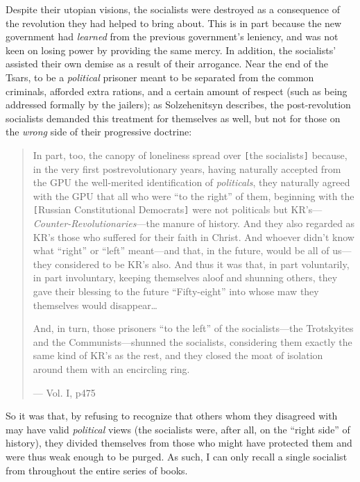 \documentclass{article}
\begin{document}
Despite their utopian visions, the socialists were destroyed as a consequence of the revolution they had helped to bring about.  This is in part because the new government had \emph{learned} from the previous government's leniency, and was not keen on losing power by providing the same mercy.  In addition, the socialists' assisted their own demise as a result of their arrogance.  Near the end of the Tsars, to be a \emph{political} prisoner meant to be separated from the common criminals, afforded extra rations, and a certain amount of respect (such as being addressed formally by the jailers); as Solzehenitsyn describes, the post-revolution socialists demanded this treatment for themselves as well, but not for those on the \emph{wrong} side of their progressive doctrine:

\begin{quote}
In part, too, the canopy of loneliness spread over \verb|[|the socialists\verb|]| because, in the very first postrevolutionary years, having naturally accepted from the GPU the well-merited identification of \emph{politicals}, they naturally agreed with the GPU that all who were ``to the right'' of them, beginning with the \verb|[|Russian Constitutional Democrats\verb|]| were not politicals but KR's---\emph{Counter-Revolutionaries}---the manure of history.  And they also regarded as KR's those who suffered for their faith in Christ.  And whoever didn't know what ``right'' or ``left'' meant---and that, in the future, would be all of us---they considered to be KR's also.  And thus it was that, in part voluntarily, in part involuntary, keeping themselves aloof and shunning others, they gave their blessing to the future ``Fifty-eight'' into whose maw they themselves would disappear\ldots

And, in turn, those prisoners ``to the left'' of the socialists---the Trotskyites and the Communists---shunned the socialists, considering them exactly the same kind of KR's as the rest, and they closed the moat of isolation around them with an encircling ring.

--- Vol. I, p475
\end{quote}

So it was that, by refusing to recognize that others whom they disagreed with may have valid \emph{political} views (the socialists were, after all, on the ``right side'' of history), they divided themselves from those who might have protected them and were thus weak enough to be purged.  As such, I can only recall a single socialist from throughout the entire series of books.
\end{document}
